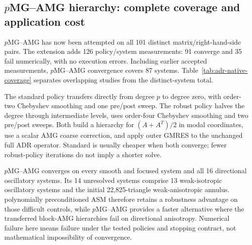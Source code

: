 \subsection{$p$MG--AMG hierarchy: complete coverage and application cost}
\label{sec:adr-native-completion}
$p$MG--AMG has now been attempted on all 101 distinct matrix/right-hand-side
pairs. The extension adds 126 policy/system measurements: 91 converge and
35 fail numerically, with no execution errors. Including earlier accepted
measurements, $p$MG--AMG convergence covers 87 systems. Table~\ref{tab:adr-native-coverage}
separates overlapping studies from the distinct-system total.

The standard policy transfers directly from degree $p$ to degree zero, with
order-two Chebyshev smoothing and one pre/post sweep. The robust policy
halves the degree through intermediate levels, uses order-four Chebyshev
smoothing and two pre/post sweeps. Both build a hierarchy for $(A+A^T)/2$
in modal coordinates, use a scalar AMG coarse correction, and apply outer
GMRES to the unchanged full ADR operator. Standard is usually cheaper when
both converge; fewer robust-policy iterations do not imply a shorter solve.

\begin{table}[!htbp]
 \centering\small
 
 \caption{$p$MG--AMG coverage. Study rows overlap; the last row counts each
 matrix/right-hand-side pair once. Convergence means at least one $p$MG--AMG
 policy passes the physical-residual contract.}
 \label{tab:adr-native-coverage}
\end{table}

$p$MG--AMG converges on every smooth and focused system and all 16 directional
oscillatory systems. Its 14 unresolved systems comprise 13 weak-isotropic
oscillatory systems and the initial 22,825-triangle weak-anisotropic annulus.
polynomially preconditioned ASM therefore retains a robustness advantage on those difficult controls,
while $p$MG--AMG provides a faster alternative where the transferred block-AMG
hierarchies fail on directional anisotropy. Numerical failure here means
failure under the tested policies and stopping contract, not mathematical
impossibility of convergence.

\begin{table}[!htbp]
 \centering\small
 
 \caption{Separate standard-policy $p$MG--AMG profiles near one million trace
 unknowns. Apply is the mean of ten warmed complete applications; calls and
 GPU share come from an independently instrumented solve. These profiles do
 not enter timing rankings. Failed cases receive no performance profile.}
 \label{tab:adr-native-applications}
\end{table}

